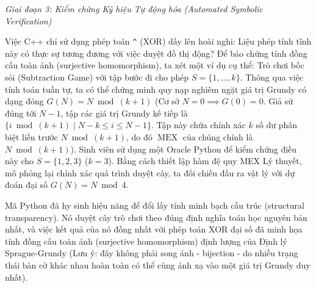 \documentclass{article}
\begin{document}
\vspace{0.5em}\noindent\emph{Giai đoạn 3: Kiểm chứng Ký hiệu Tự động hóa (Automated Symbolic Verification)}

Việc C++ chỉ sử dụng phép toán \texttt{\^{}} (XOR) dấy lên hoài nghi: Liệu phép tính tĩnh này có thực sự tương đương với việc duyệt đồ thị động? Để bảo chứng tính đồng cấu toàn ánh (surjective homomorphism), ta xét một ví dụ cụ thể: Trò chơi bốc sỏi (Subtraction Game) với tập bước đi cho phép $S = \{1, \dots, k\}$. Thông qua việc tính toán tuần tự, ta có thể chứng minh quy nạp nghiêm ngặt giá trị Grundy có dạng đóng $G(N) = N \bmod (k+1)$ (Cơ sở $N=0 \implies G(0)=0$. Giả sử đúng tới $N-1$, tập các giá trị Grundy kế tiếp là $\{i \bmod (k+1) \mid N-k \le i \le N-1\}$. Tập này chứa chính xác $k$ số dư phân biệt liền trước $N \bmod (k+1)$, do đó $\operatorname{MEX}$ của chúng chính là $N \bmod (k+1)$). Sinh viên sử dụng một Oracle Python để kiểm chứng điều này cho $S=\{1, 2, 3\}$ ($k=3$). Bằng cách thiết lập hàm đệ quy MEX Lý thuyết, mô phỏng lại chính xác quá trình duyệt cây, ta đối chiếu đầu ra vật lý với dự đoán đại số $G(N) = N \bmod 4$.

Mã Python đã hy sinh hiệu năng để đổi lấy tính minh bạch cấu trúc (structural transparency). Nó duyệt cây trò chơi theo đúng định nghĩa toán học nguyên bản nhất, và việc kết quả của nó đồng nhất với phép toán XOR đại số đã minh họa tính đồng cấu toàn ánh (surjective homomorphism) định lượng của Định lý Sprague-Grundy (Lưu ý: đây không phải song ánh - bijection - do nhiều trạng thái bàn cờ khác nhau hoàn toàn có thể cùng ánh xạ vào một giá trị Grundy duy nhất).
\end{document}
